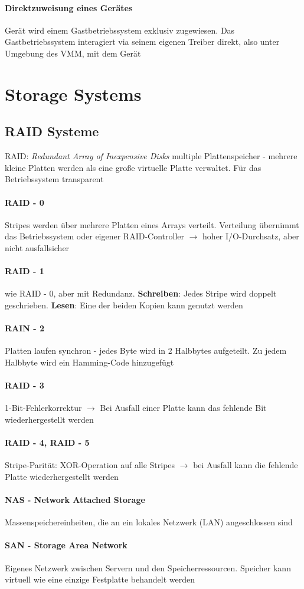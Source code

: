 \documentclass[11pt,a4paper,landscape]{article}
\begin{document}
\begin{multicols*}{3}
	\paragraph{Direktzuweisung eines Gerätes} Gerät wird einem Gastbetriebssystem exklusiv zugewiesen. Das Gastbetriebssystem interagiert via seinem eigenen Treiber direkt, also unter Umgebung des VMM, mit dem Gerät
	\section{Storage Systems}
	\subsection{RAID Systeme}
	RAID: \textit{Redundant Array of Inexpensive Disks} multiple Plattenspeicher - mehrere kleine Platten werden als eine große virtuelle Platte verwaltet. Für das Betriebssystem transparent
	\paragraph{RAID - 0} Stripes werden über mehrere Platten eines Arrays verteilt. Verteilung übernimmt das Betriebssystem oder eigener RAID-Controller $\rightarrow$ hoher I/O-Durchsatz, aber nicht ausfallsicher
	\paragraph{RAID - 1} wie RAID - 0, aber mit Redundanz. \textbf{Schreiben}: Jedes Stripe wird doppelt geschrieben. \textbf{Lesen}: Eine der beiden Kopien kann genutzt werden
	\paragraph{RAIN - 2} Platten laufen synchron - jedes Byte wird in 2 Halbbytes aufgeteilt. Zu jedem Halbbyte wird ein Hamming-Code hinzugefügt
	\paragraph{RAID - 3} 1-Bit-Fehlerkorrektur $\rightarrow$ Bei Ausfall einer Platte kann das fehlende Bit wiederhergestellt werden
	\paragraph{RAID - 4, RAID - 5} Stripe-Parität: XOR-Operation auf alle Stripes $\rightarrow$ bei Ausfall kann die fehlende Platte wiederhergestellt werden
	\paragraph{NAS - Network Attached Storage} Massenspeichereinheiten, die an ein lokales Netzwerk (LAN) angeschlossen sind
	\paragraph{SAN - Storage Area Network} Eigenes Netzwerk zwischen Servern und den Speicherressourcen. Speicher kann virtuell wie eine einzige Festplatte behandelt werden
	\end{multicols*}
\end{document}
